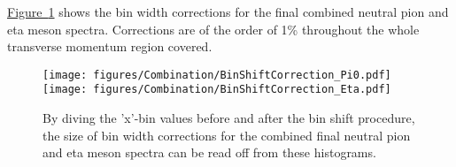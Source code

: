 %
 \hyperref[fig:binShift]{Figure~\ref*{fig:binShift}} shows the bin width corrections for the final combined neutral pion and eta meson spectra. Corrections are of the order of 1\% throughout the whole transverse momentum region covered.

 		\begin{figure}[h]
 			\centering
 			\texttt{[image: figures/Combination/BinShiftCorrection\_Pi0.pdf]}
 			\texttt{[image: figures/Combination/BinShiftCorrection\_Eta.pdf]}
 			\caption{By diving the 'x'-bin values before and after the bin shift procedure, the size of bin width corrections for the combined final neutral pion and eta meson spectra can be read off from these histograms.}
 			\label{fig:binShift}
 		\end{figure}

%
%
%
